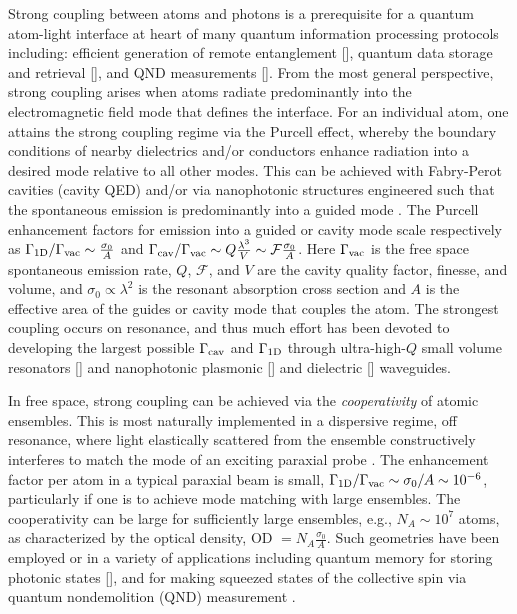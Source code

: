 \documentclass[preprint,aps,pra,onecolumn]{revtex4-1} %
\newcommand{\oneD}{{\rm 1D}}
\newcommand{\vac}{{\rm vac}}
\newcommand{\cav}{{\rm cav}}
\newcommand{\comment}[1]{{\color{Maroon} #1}}
\begin{document}
Strong coupling between atoms and photons is a prerequisite for a quantum atom-light interface at heart of many quantum information processing protocols including: efficient generation of remote entanglement [], quantum data storage and retrieval [], and QND measurements [].  From the most general perspective, strong coupling arises when atoms radiate predominantly into the electromagnetic field mode that defines the interface.  For an 
individual atom, one attains the strong coupling regime via the Purcell effect, whereby the boundary 
conditions of nearby dielectrics and/or conductors enhance radiation into a desired mode relative to all 
other modes.  This can be achieved with Fabry-Perot cavities (cavity QED) \cite{} and/or via nanophotonic structures engineered such that the spontaneous emission is predominantly into a guided mode \cite{manga_rao_single_2007,hakuta_manipulating_2012, hung_trapped_2013}.  The Purcell enhancement factors for emission into a guided or cavity mode scale respectively as  $ \Gamma_{\oneD}/\Gamma_{\vac} \sim \frac{\sigma_0}{A}$ and  
$\Gamma_{\cav}/\Gamma_{\vac} \sim   Q \frac{\lambda^3}{V}\sim \mathcal{F}  \frac{\sigma_0}{A}$.  
Here $\Gamma_{\vac}$ is the free space spontaneous emission rate, $Q$, $\mathcal{F}$, and $V$ are the cavity quality factor, finesse, and volume, and $\sigma_0 \propto \lambda^2$ is the resonant absorption cross 
section and $A$ is the effective area of the guides or cavity mode that couples the atom.  The strongest 
coupling occurs on resonance, and thus much effort has been devoted to developing the largest possible 
$\Gamma_{\cav}$ and $\Gamma_{\oneD}$ through ultra-high-$Q$ small volume resonators [] and 
nanophotonic plasmonic [] and dielectric [] waveguides.  


In free space, strong coupling can be achieved via the {\em cooperativity} of atomic ensembles.  This is most 
naturally implemented in a dispersive regime, off resonance, where light elastically scattered 
from the ensemble constructively interferes to match the mode of an exciting paraxial probe \cite{baragiola_three-dimensional_2014}.  The enhancement factor per atom in a typical paraxial beam is small, $\Gamma_{\oneD}/\Gamma_{\vac} \sim \sigma_0/A  \sim 10^{-6}$, particularly if one is to achieve mode matching with large ensembles.  The cooperativity can be large for  sufficiently large ensembles, e.g., $N_A \sim  10^7$ atoms, as characterized by the optical density, OD $= N_A \frac{\sigma_0}{A}$.  Such geometries have been employed or in a variety of applications including quantum memory for storing photonic states [], and for  making squeezed states of the collective spin via quantum nondemolition (QND) measurement \cite{kuzmich_generation_2000}.   
\end{document}
